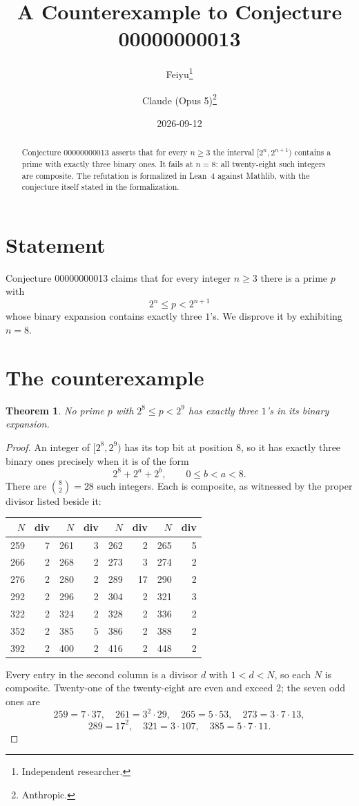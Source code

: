 \documentclass[11pt]{article}
\title{A Counterexample to Conjecture 00000000013}
\author{%
  Feiyu\thanks{Independent researcher.}
  \and
  Claude (Opus 5)\thanks{Anthropic.}%
}
\date{2026-09-12}
\theoremstyle{plain}
\newtheorem{theorem}{Theorem}
\theoremstyle{remark}
\begin{document}
\maketitle

\begin{abstract}
Conjecture 00000000013 asserts that for every $n\ge3$ the interval
$[2^n,2^{n+1})$ contains a prime with exactly three binary ones. It fails at
$n=8$: all twenty-eight such integers are composite. The refutation is
formalized in Lean~4 against Mathlib, with the conjecture itself stated in the
formalization.
\end{abstract}

\section{Statement}

Conjecture 00000000013 claims that for every integer $n\ge3$ there is a prime
$p$ with
\[
  2^n\le p<2^{n+1}
\]
whose binary expansion contains exactly three $1$'s. We disprove it by
exhibiting $n=8$.

\section{The counterexample}

\begin{theorem}
No prime $p$ with $2^8\le p<2^9$ has exactly three $1$'s in its binary
expansion.
\end{theorem}

\begin{proof}
An integer of $[2^8,2^9)$ has its top bit at position $8$, so it has exactly
three binary ones precisely when it is of the form
\[
  2^8+2^a+2^b,\qquad 0\le b<a<8 .
\]
There are $\binom82=28$ such integers. Each is composite, as witnessed by the
proper divisor listed beside it:

\begin{center}
\begin{tabular}{rrrrrrrr}
\toprule
$N$ & div & $N$ & div & $N$ & div & $N$ & div\\
\midrule
259 & 7  & 261 & 3  & 262 & 2  & 265 & 5\\
266 & 2  & 268 & 2  & 273 & 3  & 274 & 2\\
276 & 2  & 280 & 2  & 289 & 17 & 290 & 2\\
292 & 2  & 296 & 2  & 304 & 2  & 321 & 3\\
322 & 2  & 324 & 2  & 328 & 2  & 336 & 2\\
352 & 2  & 385 & 5  & 386 & 2  & 388 & 2\\
392 & 2  & 400 & 2  & 416 & 2  & 448 & 2\\
\bottomrule
\end{tabular}
\end{center}

Every entry in the second column is a divisor $d$ with $1<d<N$, so each $N$ is
composite. Twenty-one of the twenty-eight are even and exceed $2$; the seven
odd ones are
\[
  259=7\cdot37,\quad 261=3^2\cdot29,\quad 265=5\cdot53,\quad
  273=3\cdot7\cdot13,
\]
\[
  289=17^2,\quad 321=3\cdot107,\quad 385=5\cdot7\cdot11 .
\]
\end{proof}
\end{document}
